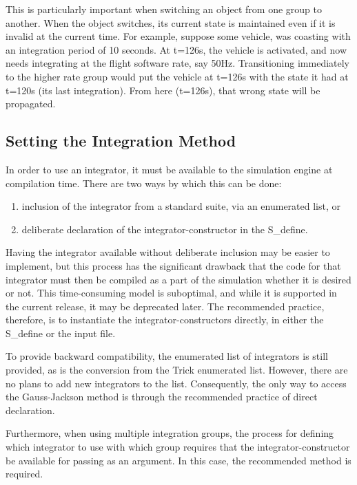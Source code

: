 This is particularly important when switching an object from one group to 
another.  When the object switches, its current state is maintained even if it 
is invalid at the current time.  For example, suppose some vehicle, was 
coasting with an integration period of 10 seconds.  At t=126s, the vehicle is 
activated, and now needs integrating at the flight software rate, say 50Hz.  
Transitioning immediately to the higher rate group would put the vehicle at 
t=126s with the state it had at t=120s (its last integration).  From here 
(t=126s), that wrong state will be propagated.






\subsection{Setting the Integration Method}
\label{sec:user_simdev_integrator}

In order to use an integrator, it must be available to the simulation engine 
at compilation time.  There are two ways by which this can be done:
\begin{enumerate}
 \item inclusion of the integrator from a standard suite, via an enumerated 
 list, or
 \item deliberate declaration of the integrator-constructor in the S\_define.
\end{enumerate}

Having the integrator available without deliberate inclusion may be easier to 
implement, but this process has the significant drawback that 
the code for that integrator must then be compiled as a part of the simulation 
whether it is desired or not.  This time-consuming model is suboptimal, and 
while it is supported in the current release, it may be deprecated later.  The 
recommended practice, therefore, is to instantiate the integrator-constructors 
directly, in either the S\_define or the input file.

To provide backward compatibility, the enumerated list of integrators is still 
provided, as is the conversion from the Trick enumerated list.  However, there 
are no plans to add new integrators to the list.  Consequently, the only way 
to access the Gauss-Jackson method is through the recommended practice of 
direct declaration.

Furthermore, when using multiple integration groups, the process for defining 
which integrator to use with which group requires that the 
integrator-constructor be 
available for passing as an argument.  In this case, the 
recommended method is required.

